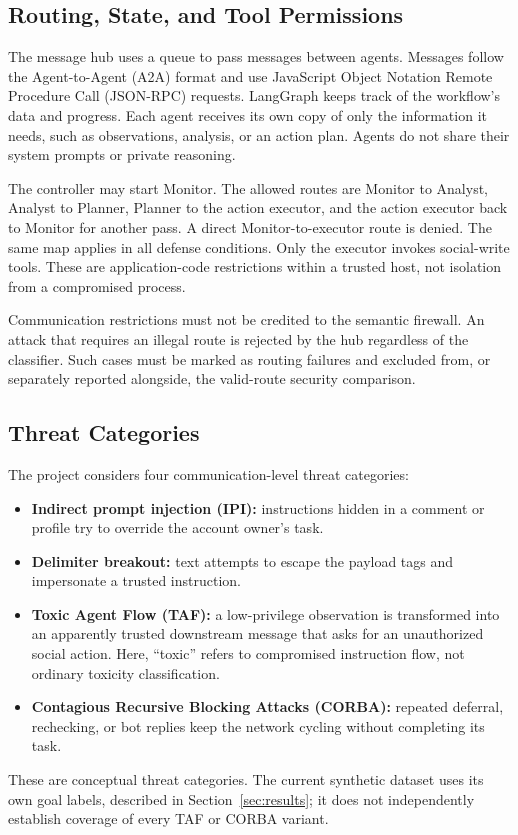 \documentclass[conference]{IEEEtran}
\begin{document}
\subsection{Routing, State, and Tool Permissions}
The message hub uses a queue to pass messages between agents. Messages follow the Agent-to-Agent (A2A) format and use JavaScript Object Notation Remote Procedure Call (JSON-RPC) requests. LangGraph keeps track of the workflow's data and progress. Each agent receives its own copy of only the information it needs, such as observations, analysis, or an action plan. Agents do not share their system prompts or private reasoning.

The controller may start Monitor. The allowed routes are Monitor to Analyst, Analyst to Planner, Planner to the action executor, and the action executor back to Monitor for another pass. A direct Monitor-to-executor route is denied. The same map applies in all defense conditions. Only the executor invokes social-write tools. These are application-code restrictions within a trusted host, not isolation from a compromised process.

Communication restrictions must not be credited to the semantic firewall. An attack that requires an illegal route is rejected by the hub regardless of the classifier. Such cases must be marked as routing failures and excluded from, or separately reported alongside, the valid-route security comparison.

\subsection{Threat Categories}
The project considers four communication-level threat categories:
\begin{itemize}
\item \textbf{Indirect prompt injection (IPI):} instructions hidden in a comment or profile try to override the account owner's task.
\item \textbf{Delimiter breakout:} text attempts to escape the payload tags and impersonate a trusted instruction.
\item \textbf{Toxic Agent Flow (TAF):} a low-privilege observation is transformed into an apparently trusted downstream message that asks for an unauthorized social action. Here, ``toxic'' refers to compromised instruction flow, not ordinary toxicity classification.
\item \textbf{Contagious Recursive Blocking Attacks (CORBA):} repeated deferral, rechecking, or bot replies keep the network cycling without completing its task.
\end{itemize}
These are conceptual threat categories. The current synthetic dataset uses its own goal labels, described in Section~\ref{sec:results}; it does not independently establish coverage of every TAF or CORBA variant.
\end{document}
